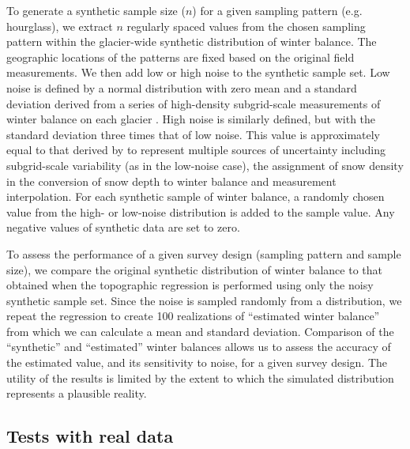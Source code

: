 \documentclass{article}
\begin{document}
To generate a synthetic sample size ($n$) for a given sampling pattern (e.g. hourglass), we extract $n$ regularly spaced values from the chosen sampling pattern within the glacier-wide synthetic distribution of winter balance. 
The geographic locations of the patterns are fixed based on the original field measurements.    
We then add low or high noise to the synthetic sample set. Low noise is defined by a normal distribution with zero mean and a standard deviation derived from a series of high-density subgrid-scale measurements of winter balance on each glacier \citep{Pulwicki2017}.  
High noise is similarly defined, but with the standard deviation three times that of low noise. This value is approximately equal to that derived by \citet{Pulwicki2017} to represent multiple sources of uncertainty including subgrid-scale variability (as in the low-noise case), the assignment of snow density in the conversion of snow depth to winter balance and measurement interpolation.
For each synthetic sample of winter balance, a randomly chosen value from the high- or low-noise distribution is added to the sample value. Any negative values of synthetic data are set to zero. 

To assess the performance of a given survey design (sampling pattern and sample size), we compare the original synthetic distribution of winter balance to that obtained when the topographic regression is performed using only the noisy synthetic sample set. 
Since the noise is sampled randomly from a distribution, we repeat the regression to create 100 realizations of ``estimated winter balance'' from which we can calculate a mean and standard deviation. Comparison of the ``synthetic'' and ``estimated'' winter balances allows us to assess the accuracy of the estimated value, and its sensitivity to noise, for a given survey design. 
The utility of the results is limited by the extent to which the simulated distribution represents a plausible reality.   
 
 \subsection{Tests with real data}
 
\end{document}
